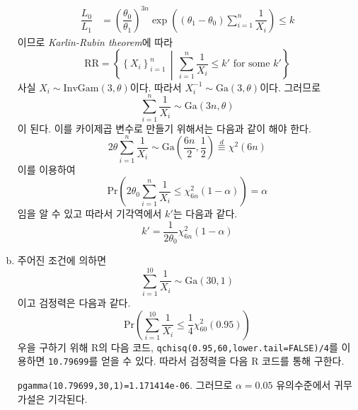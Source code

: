 \documentclass[answers]{exam}
\begin{document}
\begin{questions}
\begin{solution}
\begin{enumerate}[(a)]
\begin{align}
        \dfrac{L_{0}}{L_{1}} &= \left(\dfrac{\theta_{0}}{\theta_{1}}\right)^{3n}\exp\left(\left(\theta_{1}-\theta_{0}\right)\sum_{i=1}^{n}\dfrac{1}{X_{i}}\right)\leq k
      \end{align}
      이므로 \emph{Karlin-Rubin theorem}에 따라
      \begin{equation}
        \mathrm{RR}=\left\{\left\{X_{i}\right\}_{i=1}^{n}\,\middle|\, \sum_{i=1}^{n}\dfrac{1}{X_{i}}\leq k' \text{ for some $k'$} \right\}
      \end{equation}
      사실 $X_{i}\sim\mathrm{InvGam}\left(3,\theta\right)$이다. 따라서 $X_{i}^{-1}\sim\mathrm{Ga}\left(3,\theta\right)$이다. 그러므로
      \begin{equation}
        \sum_{i=1}^{n}\dfrac{1}{X_{i}} \sim \mathrm{Ga}\left(3n,\theta\right)
      \end{equation}
      이 된다. 이를 카이제곱 변수로 만들기 위해서는 다음과 같이 해야 한다.
      \begin{equation}
        2\theta\sum_{i=1}^{n}\dfrac{1}{X_{i}} \sim \mathrm{Ga}\left(\dfrac{6n}{2},\dfrac{1}{2}\right)\overset{d}{\equiv} \chi^{2}\left(6n\right)
      \end{equation}
      이를 이용하여
      \begin{equation}
        \mathrm{Pr}\left(2\theta_{0}\sum_{i=1}^{n}\dfrac{1}{X_{i}}\leq \chi^{2}_{6n}\left(1-\alpha\right)\right) = \alpha
      \end{equation}
      임을 알 수 있고 따라서 기각역에서 $k'$는 다음과 같다.
      \begin{equation}
        k' = \dfrac{1}{2\theta_{0}}\chi_{6n}^{2}\left(1-\alpha\right)
      \end{equation}
      \item 주어진 조건에 의하면
      \begin{equation}
        \sum_{i=1}^{10}\dfrac{1}{X_{i}} \sim \mathrm{Ga}\left(30,1\right)
      \end{equation}
      이고 검정력은 다음과 같다.
      \begin{equation}
        \mathrm{Pr}\left(\sum_{i=1}^{10}\dfrac{1}{X_{i}}\leq \dfrac{1}{4}\chi_{60}^{2}\left(0.95\right)\right)
      \end{equation}
      우을 구하기 위해 \textsf{R}의 다음 코드, \texttt{qchisq(0.95,60,lower.tail=FALSE)/4}를 이용하면 \texttt{10.79699}를 얻을 수 있다. 따라서 검정력을 다음 \textsf{R} 코드를 통해 구한다.\par \texttt{pgamma(10.79699,30,1)=1.171414e-06}. 그러므로 $\alpha=0.05$ 유의수준에서 귀무가설은 기각된다.

\end{enumerate}
\end{solution}
\end{questions}
\end{document}
